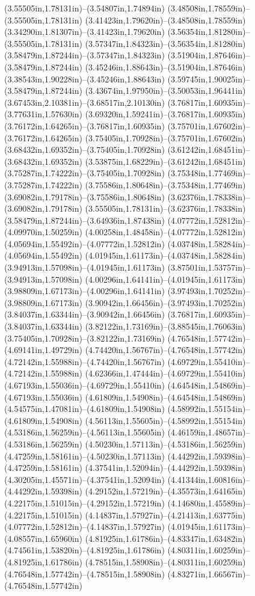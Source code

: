 (3.55505in,1.78131in)--(3.54807in,1.74894in) (3.48508in,1.78559in)--(3.55505in,1.78131in) (3.41423in,1.79620in)--(3.48508in,1.78559in) (3.34290in,1.81307in)--(3.41423in,1.79620in) (3.56354in,1.81280in)--(3.55505in,1.78131in) (3.57347in,1.84323in)--(3.56354in,1.81280in) (3.58479in,1.87244in)--(3.57347in,1.84323in) (3.51904in,1.87646in)--(3.58479in,1.87244in) (3.45246in,1.88643in)--(3.51904in,1.87646in) (3.38543in,1.90228in)--(3.45246in,1.88643in) (3.59745in,1.90025in)--(3.58479in,1.87244in) (3.43674in,1.97950in)--(3.50053in,1.96441in) (3.67453in,2.10381in)--(3.68517in,2.10130in) (3.76817in,1.60935in)--(3.77631in,1.57630in) (3.69320in,1.59241in)--(3.76817in,1.60935in) (3.76172in,1.64265in)--(3.76817in,1.60935in) (3.75701in,1.67602in)--(3.76172in,1.64265in) (3.75405in,1.70928in)--(3.75701in,1.67602in) (3.68432in,1.69352in)--(3.75405in,1.70928in) (3.61242in,1.68451in)--(3.68432in,1.69352in) (3.53875in,1.68229in)--(3.61242in,1.68451in) (3.75287in,1.74222in)--(3.75405in,1.70928in) (3.75348in,1.77469in)--(3.75287in,1.74222in) (3.75586in,1.80648in)--(3.75348in,1.77469in) (3.69082in,1.79178in)--(3.75586in,1.80648in) (3.62376in,1.78338in)--(3.69082in,1.79178in) (3.55505in,1.78131in)--(3.62376in,1.78338in) (3.58479in,1.87244in)--(3.64936in,1.87438in) (4.07772in,1.52812in)--(4.09970in,1.50259in) (4.00258in,1.48458in)--(4.07772in,1.52812in) (4.05694in,1.55492in)--(4.07772in,1.52812in) (4.03748in,1.58284in)--(4.05694in,1.55492in) (4.01945in,1.61173in)--(4.03748in,1.58284in) (3.94913in,1.57098in)--(4.01945in,1.61173in) (3.87501in,1.53757in)--(3.94913in,1.57098in) (4.00296in,1.64141in)--(4.01945in,1.61173in) (3.98809in,1.67173in)--(4.00296in,1.64141in) (3.97493in,1.70252in)--(3.98809in,1.67173in) (3.90942in,1.66456in)--(3.97493in,1.70252in) (3.84037in,1.63344in)--(3.90942in,1.66456in) (3.76817in,1.60935in)--(3.84037in,1.63344in) (3.82122in,1.73169in)--(3.88545in,1.76063in) (3.75405in,1.70928in)--(3.82122in,1.73169in) (4.76548in,1.57742in)--(4.69141in,1.49729in) (4.74420in,1.56767in)--(4.76548in,1.57742in) (4.72142in,1.55988in)--(4.74420in,1.56767in) (4.69729in,1.55410in)--(4.72142in,1.55988in) (4.62366in,1.47444in)--(4.69729in,1.55410in) (4.67193in,1.55036in)--(4.69729in,1.55410in) (4.64548in,1.54869in)--(4.67193in,1.55036in) (4.61809in,1.54908in)--(4.64548in,1.54869in) (4.54575in,1.47081in)--(4.61809in,1.54908in) (4.58992in,1.55154in)--(4.61809in,1.54908in) (4.56113in,1.55605in)--(4.58992in,1.55154in) (4.53186in,1.56259in)--(4.56113in,1.55605in) (4.46159in,1.48657in)--(4.53186in,1.56259in) (4.50230in,1.57113in)--(4.53186in,1.56259in) (4.47259in,1.58161in)--(4.50230in,1.57113in) (4.44292in,1.59398in)--(4.47259in,1.58161in) (4.37541in,1.52094in)--(4.44292in,1.59398in) (4.30205in,1.45571in)--(4.37541in,1.52094in) (4.41344in,1.60816in)--(4.44292in,1.59398in) (4.29152in,1.57219in)--(4.35573in,1.64165in) (4.22175in,1.51015in)--(4.29152in,1.57219in) (4.14680in,1.45589in)--(4.22175in,1.51015in) (4.14837in,1.57927in)--(4.21413in,1.63775in) (4.07772in,1.52812in)--(4.14837in,1.57927in) (4.01945in,1.61173in)--(4.08557in,1.65960in) (4.81925in,1.61786in)--(4.83347in,1.63482in) (4.74561in,1.53820in)--(4.81925in,1.61786in) (4.80311in,1.60259in)--(4.81925in,1.61786in) (4.78515in,1.58908in)--(4.80311in,1.60259in) (4.76548in,1.57742in)--(4.78515in,1.58908in) (4.83271in,1.66567in)--(4.76548in,1.57742in) 